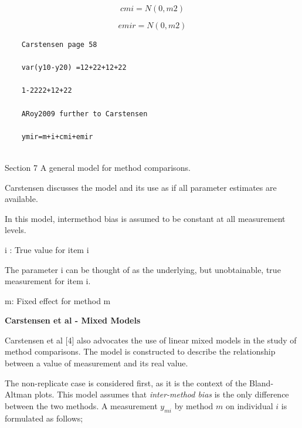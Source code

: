 \documentclass[12pt, a4paper]{report}
\theoremstyle{plain}
\theoremstyle{definition}
\theoremstyle{remark}
\begin{document}
	\[cmi=N(0,m2)\]
	
	\[emir=N(0,m2)\]
	
	\begin{verbatim}
	Carstensen page 58
	
	var(y10-y20) =12+22+12+22
	
	1-2222+12+22
	
	ARoy2009 further to Carstensen
	
	ymir=m+i+cmi+emir
	
	\end{verbatim}
	
	
	Section 7 A general model for method comparisons.
	
	Carstensen discusses the model and its use as if all parameter estimates are available.
	
	In this model, intermethod bias is assumed to be constant at all measurement levels.
	
	i : True value for item i
	
	The parameter i can be thought of as the underlying, but unobtainable, true measurement for item i.
	
	m: Fixed effect for method m
	
	
	\textbf{Carstensen et al - Mixed Models}
	
	Carstensen et al [4] also advocates the use of linear mixed models in
	the study of method comparisons. The model is constructed to
	describe the relationship between a value of measurement and its
	real value. 
	
	The non-replicate case is considered first, as it is
	the context of the Bland-Altman plots. 
	This model assumes that
	\textit{inter-method bias} is the only difference between the two methods.
	A measurement $y_{mi}$ by method $m$ on individual $i$ is
	formulated as follows;
	
\end{document}

